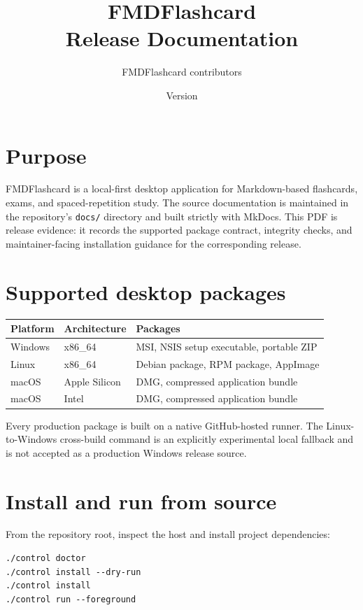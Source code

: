 \documentclass[11pt,a4paper]{article}
\title{FMDFlashcard\\Release Documentation}
\author{FMDFlashcard contributors}
\date{Version \FMDVersion}
\newcommand{\command}[1]{\texttt{#1}}
\begin{document}
\maketitle
\tableofcontents

\section{Purpose}

FMDFlashcard is a local-first desktop application for Markdown-based flashcards,
exams, and spaced-repetition study. The source documentation is maintained in
the repository's \command{docs/} directory and built strictly with MkDocs. This
PDF is release evidence: it records the supported package contract, integrity
checks, and maintainer-facing installation guidance for the corresponding
release.

\section{Supported desktop packages}

\begin{longtable}{@{}lll@{}}
\toprule
Platform & Architecture & Packages \\
\midrule
Windows & x86\_64 & MSI, NSIS setup executable, portable ZIP \\
Linux & x86\_64 & Debian package, RPM package, AppImage \\
macOS & Apple Silicon & DMG, compressed application bundle \\
macOS & Intel & DMG, compressed application bundle \\
\bottomrule
\end{longtable}

Every production package is built on a native GitHub-hosted runner. The
Linux-to-Windows cross-build command is an explicitly experimental local
fallback and is not accepted as a production Windows release source.

\section{Install and run from source}

From the repository root, inspect the host and install project dependencies:

\begin{verbatim}
./control doctor
./control install --dry-run
./control install
./control run --foreground
\end{verbatim}
\end{document}
